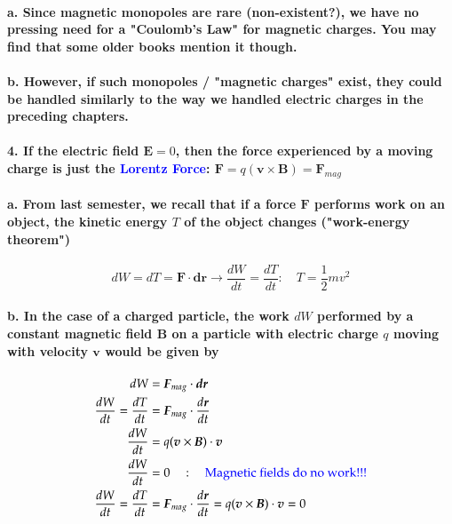 \documentclass{article}
\begin{document}
\paragraph{\indent a. Since magnetic monopoles are rare (non-existent?), we have no pressing need for a "Coulomb's Law" for magnetic charges. You may find that some older books mention it though.}
\paragraph{\indent b. However, if such monopoles / "magnetic charges" exist, they could be handled similarly to the way we handled electric charges in the preceding chapters.}
\paragraph{4. If the electric field $\boldsymbol{E}=0$, then the force experienced by a moving charge is just the \textcolor{blue}{Lorentz Force}: $\boldsymbol{F}=q(\boldsymbol{v}\times \boldsymbol{B})=\boldsymbol{F}_{mag}$}
\paragraph{\indent a. From last semester, we recall that if a force $\boldsymbol{F}$ performs work on an object, the kinetic energy $T$ of the object changes ("work-energy theorem")}
\begin{equation*}
    dW=dT=\boldsymbol{F}\cdot\boldsymbol{dr}\longrightarrow \frac{dW}{dt}=\frac{dT}{dt}:\quad T=\frac{1}{2}mv^2
\end{equation*}
\paragraph{\indent b. In the case of a charged particle, the work $dW$ performed by a constant magnetic field $\boldsymbol{B}$ on a particle with electric charge $q$ moving with velocity $\boldsymbol{v}$ would be given by }
\begin{align*}
    dW&=\boldsymbol{F}_{mag}\cdot\boldsymbol{dr}\\
    \frac{dW}{dt}=\frac{dT}{dt}&=\boldsymbol{F}_{mag}\cdot\frac{d\boldsymbol{r}}{dt}\\
    \frac{dW}{dt}&=q(\boldsymbol{v}\times\boldsymbol{B})\cdot\boldsymbol{v}\\
    \frac{dW}{dt}&=0\quad:\quad \text{\textcolor{blue}{Magnetic fields do no work!!!}}\\
    \frac{dW}{dt}=\frac{dT}{dt}&=\boldsymbol{F}_{mag}\cdot\frac{d\boldsymbol{r}}{dt}=q(\boldsymbol{v}\times\boldsymbol{B})\cdot\boldsymbol{v}=0\\
\end{align*}
\end{document}
